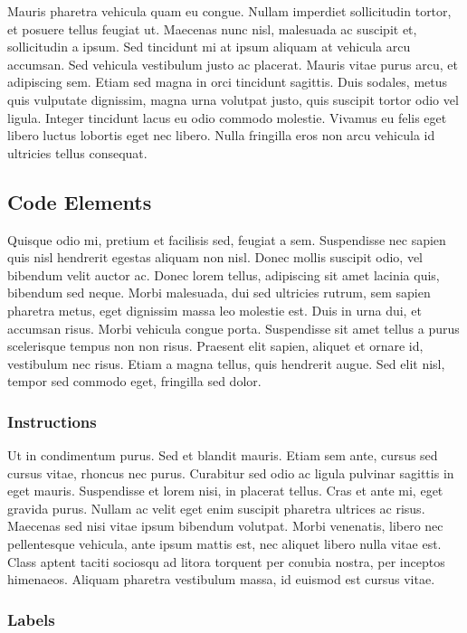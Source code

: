 \documentclass[12pt,twoside,notitlepage]{report}
\begin{document}
Mauris pharetra vehicula quam eu congue. Nullam imperdiet sollicitudin tortor, et posuere tellus feugiat ut. Maecenas nunc nisl, malesuada ac suscipit et, sollicitudin a ipsum. Sed tincidunt mi at ipsum aliquam at vehicula arcu accumsan. Sed vehicula vestibulum justo ac placerat. Mauris vitae purus arcu, et adipiscing sem. Etiam sed magna in orci tincidunt sagittis. Duis sodales, metus quis vulputate dignissim, magna urna volutpat justo, quis suscipit tortor odio vel ligula. Integer tincidunt lacus eu odio commodo molestie. Vivamus eu felis eget libero luctus lobortis eget nec libero. Nulla fringilla eros non arcu vehicula id ultricies tellus consequat.

\subsection{Code Elements}

Quisque odio mi, pretium et facilisis sed, feugiat a sem. Suspendisse nec sapien quis nisl hendrerit egestas aliquam non nisl. Donec mollis suscipit odio, vel bibendum velit auctor ac. Donec lorem tellus, adipiscing sit amet lacinia quis, bibendum sed neque. Morbi malesuada, dui sed ultricies rutrum, sem sapien pharetra metus, eget dignissim massa leo molestie est. Duis in urna dui, et accumsan risus. Morbi vehicula congue porta. Suspendisse sit amet tellus a purus scelerisque tempus non non risus. Praesent elit sapien, aliquet et ornare id, vestibulum nec risus. Etiam a magna tellus, quis hendrerit augue. Sed elit nisl, tempor sed commodo eget, fringilla sed dolor.

\subsubsection{Instructions}

Ut in condimentum purus. Sed et blandit mauris. Etiam sem ante, cursus sed cursus vitae, rhoncus nec purus. Curabitur sed odio ac ligula pulvinar sagittis in eget mauris. Suspendisse et lorem nisi, in placerat tellus. Cras et ante mi, eget gravida purus. Nullam ac velit eget enim suscipit pharetra ultrices ac risus. Maecenas sed nisi vitae ipsum bibendum volutpat. Morbi venenatis, libero nec pellentesque vehicula, ante ipsum mattis est, nec aliquet libero nulla vitae est. Class aptent taciti sociosqu ad litora torquent per conubia nostra, per inceptos himenaeos. Aliquam pharetra vestibulum massa, id euismod est cursus vitae.

\subsubsection{Labels}
\end{document}
